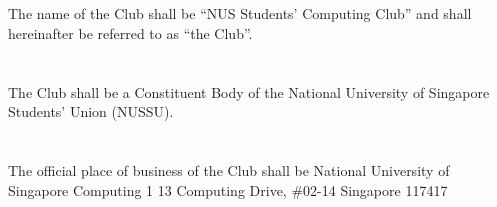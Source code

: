 
\section{}
The name of the Club shall be “NUS Students’ Computing Club” and shall hereinafter be referred to as “the Club”.

\section{}
The Club shall be a Constituent Body of the National University of Singapore Students’ Union (NUSSU).

\section{}
The official place of business of the Club shall be\newline
\hspace*{24mm}National University of Singapore\newline
\hspace*{24mm}Computing 1\newline
\hspace*{24mm}13 Computing Drive, \#02-14\newline
\hspace*{24mm}Singapore 117417
